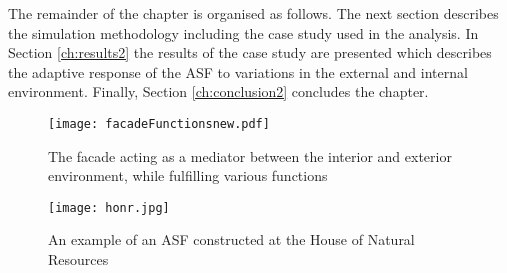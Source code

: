 The remainder of the chapter is organised as follows. The next section describes the simulation methodology including the case study used in the analysis. In Section \ref{ch:results2} the results of the case study are presented which describes the adaptive response of the ASF to variations in the external and internal environment. Finally, Section \ref{ch:conclusion2} concludes the chapter.




\begin{figure}
\begin{center}
\texttt{[image: facadeFunctionsnew.pdf]}
\caption{The facade acting as a mediator between the interior and exterior environment, while fulfilling various functions \cite{nagy2016adaptive}}
\label{fig:ASFschematic2}
\end{center}
\end{figure}

\begin{figure}
\begin{center}
\texttt{[image: honr.jpg]}
\caption{An example of an ASF constructed at the House of Natural Resources \cite{nagy2016adaptive}}
\label{fig:HoNR2}
\end{center}
\end{figure}




